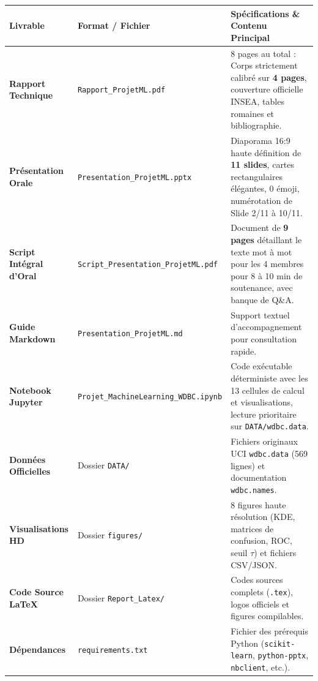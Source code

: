 \documentclass[10pt,a4paper]{article}
\begin{document}
\begin{table}[H]
\centering\small
\renewcommand{\arraystretch}{1.2}
\begin{tabularx}{\textwidth}{l l X}
	\toprule
	\textbf{Livrable} & \textbf{Format / Fichier} & \textbf{Spécifications \& Contenu Principal} \\
	\midrule
	\textbf{Rapport Technique} & \texttt{Rapport\_ProjetML.pdf} & 8 pages au total : Corps strictement calibré sur \textbf{4 pages}, couverture officielle INSEA, tables romaines et bibliographie. \\
	\textbf{Présentation Orale} & \texttt{Presentation\_ProjetML.pptx} & Diaporama 16:9 haute définition de \textbf{11 slides}, cartes rectangulaires élégantes, 0 émoji, numérotation de Slide 2/11 à 10/11. \\
	\textbf{Script Intégral d'Oral} & \texttt{Script\_Presentation\_ProjetML.pdf} & Document de \textbf{9 pages} détaillant le texte mot à mot pour les 4 membres pour 8 à 10 min de soutenance, avec banque de Q\&A. \\
	\textbf{Guide Markdown} & \texttt{Presentation\_ProjetML.md} & Support textuel d'accompagnement pour consultation rapide. \\
	\textbf{Notebook Jupyter} & \texttt{Projet\_MachineLearning\_WDBC.ipynb} & Code exécutable déterministe avec les 13 cellules de calcul et visualisations, lecture prioritaire sur \texttt{DATA/wdbc.data}. \\
	\textbf{Données Officielles} & Dossier \texttt{DATA/} & Fichiers originaux UCI \texttt{wdbc.data} (569 lignes) et documentation \texttt{wdbc.names}. \\
	\textbf{Visualisations HD} & Dossier \texttt{figures/} & 8 figures haute résolution (KDE, matrices de confusion, ROC, seuil $\tau$) et fichiers CSV/JSON. \\
	\textbf{Code Source LaTeX} & Dossier \texttt{Report\_Latex/} & Codes sources complets (\texttt{.tex}), logos officiels et figures compilables. \\
	\textbf{Dépendances} & \texttt{requirements.txt} & Fichier des prérequis Python (\texttt{scikit-learn}, \texttt{python-pptx}, \texttt{nbclient}, etc.). \\
	\bottomrule
\end{tabularx}
\end{table}

\label{LastPage}
\end{document}
